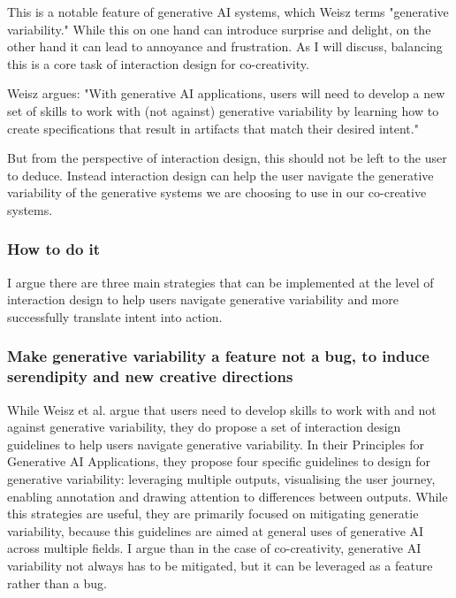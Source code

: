 This is a notable feature of generative AI systems, which Weisz \cite{Weisz2024-io} terms "generative variability." While this on one hand can introduce surprise and delight, on the other hand it can lead to annoyance and frustration. As I will discuss, balancing this is a core task of interaction design for co-creativity.

Weisz argues: "With generative AI applications, users will need to develop a new set of skills to work with (not against) generative variability by learning how to create specifications that result in artifacts that match their desired intent." 

But from the perspective of interaction design, this should not be left to the user to deduce. Instead interaction design can help the user navigate the generative variability of the generative systems we are choosing to use in our co-creative systems. 

\subsubsection{How to do it}

I argue there are three main strategies that can be implemented at the level of interaction design to help users navigate generative variability and more successfully translate intent into action. 

\subsubsection{Make generative variability a feature not a bug, to induce serendipity and new creative directions}

While Weisz et al. \cite{Weisz2024-io} argue that users need to develop skills to work with and not against generative variability, they do propose a set of interaction design guidelines to help users navigate generative variability. In their Principles for Generative AI Applications, they propose four specific guidelines to design for generative variability: leveraging multiple outputs, visualising the user journey, enabling annotation and drawing attention to differences between outputs. While this strategies are useful, they are primarily focused on mitigating generatie variability, because this guidelines are aimed at general uses of generative AI across multiple fields. I argue than in the case of co-creativity, generative AI variability not always has to be mitigated, but it can be leveraged as a feature rather than a bug. 

